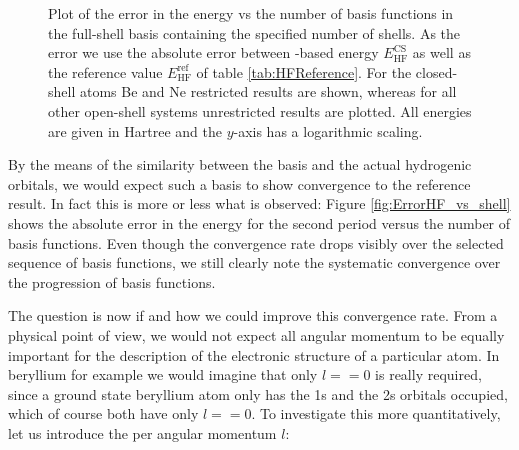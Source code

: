 \begin{figure}
	\centering
	\caption{
		Plot of the error in the \HF energy vs the number of basis
		functions in the full-shell \CS basis containing
		the specified number of shells.
		As the error we use the absolute error between \CS-based \HF energy
		$E_\text{HF}^\text{CS}$ as well as the reference value
		$E_\text{HF}^\text{ref}$ of table \vref{tab:HFReference}.
		For the closed-shell atoms Be and Ne restricted \HF results are shown,
		whereas for all other open-shell systems unrestricted \HF results
		are plotted.
		All energies are given in Hartree
		and the $y$-axis has a logarithmic scaling.
}
	\label{fig:ErrorHF_vs_shell}
\end{figure}
By the means of the similarity between the \CS basis and the actual
hydrogenic orbitals,
we would expect such a basis to show convergence to the reference \HF result.
In fact this is more or less what is observed:
Figure \vref{fig:ErrorHF_vs_shell} shows the absolute error in the \HF energy
for the second period versus the number of basis functions.
Even though the convergence rate drops visibly
over the selected sequence of basis functions,
we still clearly note the systematic convergence over the progression
of basis functions.

The question is now if and how we could improve this convergence rate.
From a physical point of view,
we would not expect all angular momentum to be equally important
for the description of the electronic structure of a particular atom.
In beryllium for example we would imagine that only $l == 0$ is really required,
since a ground state beryllium atom only has the 1s and the 2s orbitals occupied,
which of course both have only $l == 0$.
To investigate this more quantitatively,
let us introduce the 
per angular momentum $l$:

